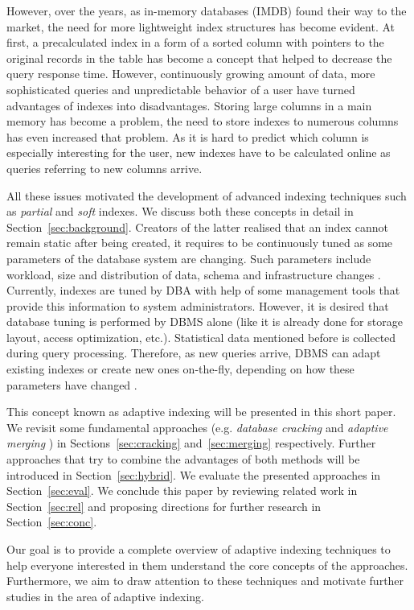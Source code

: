 \documentclass[10pt, conference, compsocconf]{IEEEtran}
\begin{document}
However, over the years, as in-memory databases (IMDB) found their way to the market, the need for more lightweight index structures has become evident. At first, a precalculated index in a form of a sorted column with pointers to the original records in the table has become a concept that helped to decrease the query response time. However, continuously growing amount of data, more sophisticated queries and unpredictable behavior of a user have turned advantages of indexes into disadvantages\cite{partial2}. Storing large columns in a main memory has become a problem, the need to store indexes to numerous columns has even increased that problem. As it is hard to predict which column is especially interesting for the user, new indexes have to be calculated online as queries referring to new columns arrive.

All these issues motivated the development of advanced indexing techniques such as \emph{partial} \cite{partial1} and \emph{soft} \cite{soft_indexes} indexes. We discuss both these concepts in detail in Section~\ref{sec:background}. Creators of the latter realised that an index cannot remain static after being created, it requires to be continuously tuned as some parameters of the database system are changing. Such parameters include workload, size and distribution of data, schema and infrastructure changes \cite{soft_indexes}. Currently, indexes are tuned by DBA with help of some management tools that provide this information to system administrators. However, it is desired that database tuning is performed by DBMS alone (like it is already done for storage layout, access optimization, etc.). Statistical data mentioned before is collected during query processing. Therefore, as new queries arrive, DBMS can adapt existing indexes or create new ones on-the-fly, depending on how these parameters have changed \cite{soft_indexes}.

This concept known as adaptive indexing will be presented in this short paper. We revisit some fundamental approaches (e.g. \emph{database cracking} \cite{cracking} and \emph{adaptive merging} \cite{merging}) in Sections~\ref{sec:cracking} and~\ref{sec:merging} respectively. Further approaches that try to combine the advantages of both methods will be introduced in Section~\ref{sec:hybrid}. We evaluate the presented approaches in Section~\ref{sec:eval}. We conclude this paper by reviewing related work in Section~\ref{sec:rel} and proposing directions for further research in Section~\ref{sec:conc}.

Our goal is to provide a complete overview of adaptive indexing techniques to help everyone interested in them understand the core concepts of the approaches. Furthermore, we aim to draw attention to these techniques and motivate further studies in the area of adaptive indexing.
\end{document}
